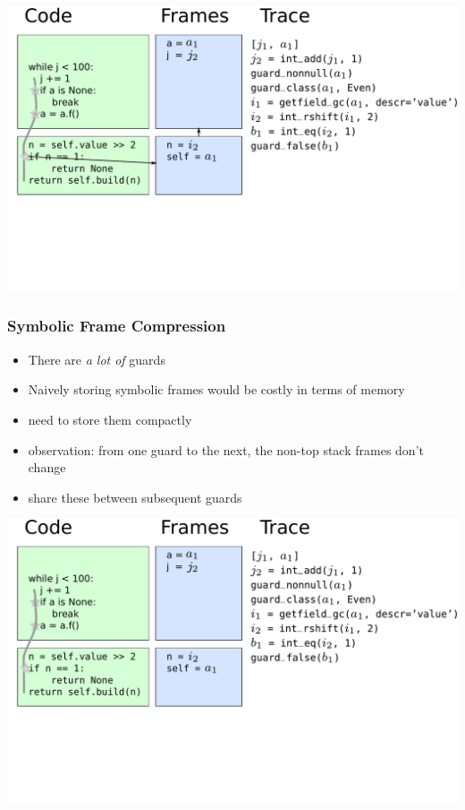 \documentclass[utf8x]{beamer}
\begin{document}
\begin{frame}
  \includegraphics[scale=0.4]{figures/framechain1}
\end{frame}


\begin{frame}
  \frametitle{Symbolic Frame Compression}
  \begin{itemize}
      \item There are \emph{a lot of} guards
      \item Naively storing symbolic frames would be costly in terms of memory
      \item need to store them compactly
      \item observation: from one guard to the next, the non-top stack frames don't change
      \item share these between subsequent guards
  \end{itemize}
\end{frame}

\begin{frame}
  \includegraphics[scale=0.4]{figures/loop07}
\end{frame}
\end{document}
